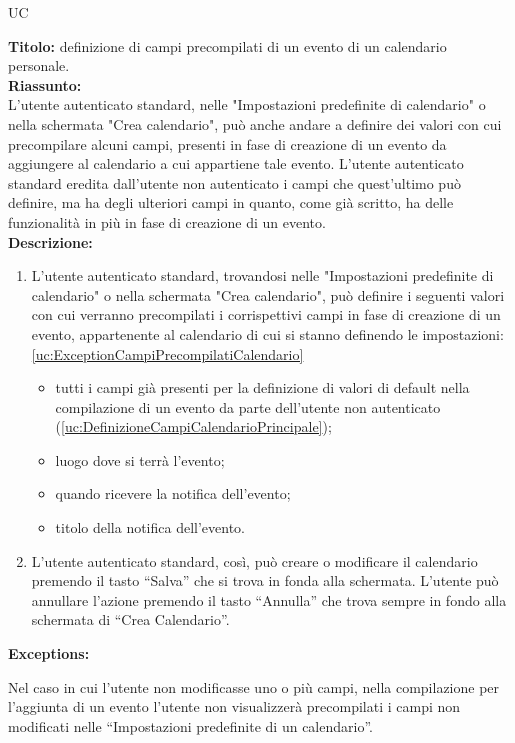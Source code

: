 \begin{listaPersonale}{UC}
\begin{listaPersonale2}[UC] {}
            \newpage
            \textbf{Titolo: } definizione di campi precompilati di un evento di un calendario personale. \\
            \textbf{Riassunto: } \\ L'utente autenticato standard, nelle "Impostazioni predefinite di calendario" o nella schermata "Crea calendario", può anche andare a definire dei valori con cui precompilare alcuni campi, presenti in fase di creazione di un evento da aggiungere al calendario a cui appartiene tale evento. L'utente autenticato standard eredita dall'utente non autenticato i campi che quest'ultimo può definire, ma ha degli ulteriori campi in quanto, come già scritto, ha delle funzionalità in più in fase di creazione di un evento. \\
            \textbf{Descrizione: } \\
            \begin {enumerate}
        \item L'utente autenticato standard, trovandosi nelle "Impostazioni predefinite di calendario" o nella schermata "Crea calendario", può definire i seguenti valori con cui verranno precompilati i corrispettivi campi in fase di creazione di un evento, appartenente al calendario di cui si stanno definendo le impostazioni: \ref{uc:ExceptionCampiPrecompilatiCalendario}
              \begin{itemize}
                  \item tutti i campi già presenti per la definizione di valori di default nella compilazione di un evento da parte dell'utente non autenticato (\ref{uc:DefinizioneCampiCalendarioPrincipale});
                  \item luogo dove si terrà l'evento;
                  \item quando ricevere la notifica dell'evento;
                  \item titolo della notifica dell'evento.
              \end{itemize}
        \item L'utente autenticato standard, così, può creare o modificare il calendario premendo il tasto “Salva” che si trova in fonda alla schermata. L'utente può annullare l'azione premendo il tasto “Annulla” che trova sempre in fondo alla schermata di “Crea Calendario”.
              \end{enumerate}
              \textbf{Exceptions:}
              \begin{enumerate}[label=\textbf{[exception \arabic{enumiii}]}, ref= \textbf{[exception \arabic{enumiii}]}]
                   Nel caso in cui l'utente non modificasse uno o più campi, nella compilazione per l'aggiunta di un evento l'utente non visualizzerà precompilati i campi non modificati nelle “Impostazioni predefinite di un calendario”.
              \end{enumerate}





\end{listaPersonale2}
\end{listaPersonale}
